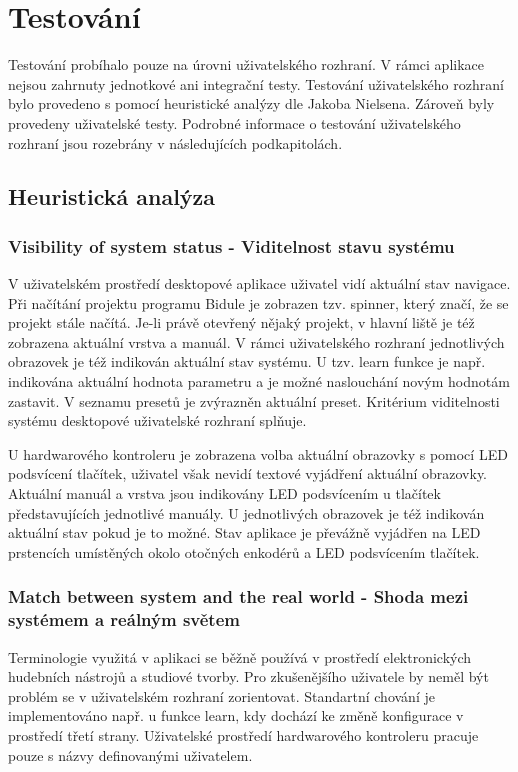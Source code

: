 \documentclass[thesis=M,czech]{FITthesis}[2019/03/06]
\begin{document}
\chapter{Testování}
	Testování probíhalo pouze na úrovni uživatelského rozhraní. V rámci aplikace nejsou zahrnuty jednotkové ani integrační testy.
	Testování uživatelského rozhraní bylo provedeno s pomocí heuristické analýzy dle Jakoba Nielsena\cite{nielsen-heuristics}. Zároveň byly provedeny uživatelské testy.
	Podrobné informace o testování uživatelského rozhraní jsou rozebrány v následujících podkapitolách.

	\section{Heuristická analýza}
		\subsection{Visibility of system status - Viditelnost stavu systému}
			V uživatelském prostředí desktopové aplikace uživatel vidí aktuální stav navigace.
			Při načítání projektu programu Bidule je zobrazen tzv. spinner,	který značí, že se projekt stále načítá.
			Je-li právě otevřený nějaký projekt, v hlavní liště je též zobrazena aktuální vrstva a manuál. 
			V rámci uživatelského rozhraní jednotlivých obrazovek je též indikován aktuální stav systému. U tzv. learn funkce je např. indikována aktuální hodnota parametru a je možné naslouchání novým hodnotám zastavit. V seznamu presetů je zvýrazněn aktuální preset.
			Kritérium viditelnosti systému desktopové uživatelské rozhraní splňuje.
			
			U hardwarového kontroleru je zobrazena volba aktuální obrazovky s pomocí LED podsvícení tlačítek, uživatel však nevidí textové vyjádření aktuální obrazovky. Aktuální manuál a vrstva jsou indikovány LED podsvícením u tlačítek představujících jednotlivé manuály. U jednotlivých obrazovek je též indikován aktuální stav pokud je to možné. Stav aplikace je převážně vyjádřen na LED prstencích umístěných okolo otočných enkodérů a LED podsvícením tlačítek.			
		\subsection{Match between system and the real world - Shoda mezi systémem a reálným světem}\label{sec:heuristics-2}
			Terminologie využitá v aplikaci se běžně používá v prostředí elektronických hudebních nástrojů a studiové tvorby. Pro zkušenějšího uživatele by neměl být problém se v uživatelském rozhraní zorientovat. 
			Standartní chování je implementováno např. u funkce learn, kdy dochází ke změně konfigurace v prostředí třetí strany.
			Uživatelské prostředí hardwarového kontroleru pracuje pouze s názvy definovanými uživatelem.
			
\end{document}
